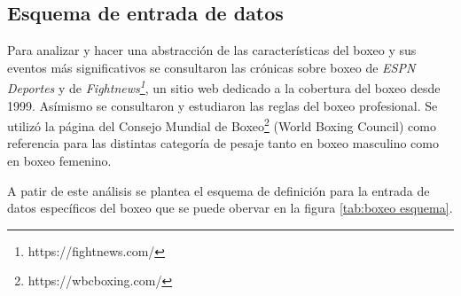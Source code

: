 \subsection{Esquema de entrada de datos}

Para analizar y hacer una abstracción de las características del boxeo y sus eventos más significativos se consultaron las crónicas sobre boxeo de 
\textit{ESPN Deportes} y de \textit{Fightnews\footnote[1]{https://fightnews.com/}}, un sitio web dedicado a la cobertura del boxeo desde 1999. 
Asímismo se consultaron y estudiaron las reglas del boxeo profesional. Se utilizó la página del Consejo Mundial de 
Boxeo\footnote[2]{https://wbcboxing.com/} (World Boxing Council) como referencia para las distintas categoría de pesaje tanto en boxeo masculino como en 
boxeo femenino.

A patir de este análisis se plantea el esquema de definición para la entrada de datos específicos del boxeo que se puede obervar en la figura \ref{tab:boxeo esquema}. 

